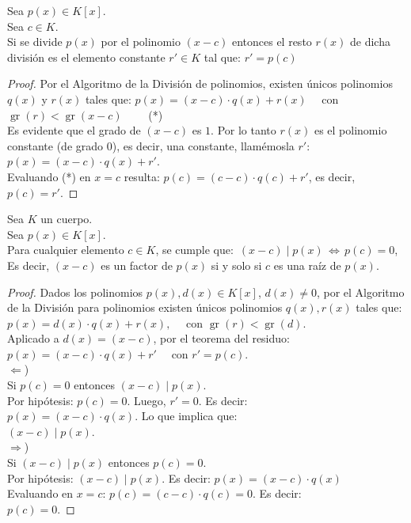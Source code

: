\begin{enunciado}\label{enun:teoResid}
Sea $p(x)  \in K[x]$. \\
Sea $c \in K$. \\
Si se divide $p(x)$ por el polinomio $(x - c)$ entonces el resto $r(x)$ de dicha división es el elemento constante $r' \in K$ tal que: $r' = p(c)$
\end{enunciado}

\begin{proof}
Por el Algoritmo de la División de polinomios, existen únicos polinomios $q(x)$ y $r(x)$ tales que: $p(x) = (x - c) \cdot q(x) + r(x) \quad$ con 
$\operatorname{gr}(r) < \operatorname{gr}(x - c) \qquad$  \hfill (*) \\
Es evidente que el grado de $(x - c)$ es $1$. Por lo tanto $r(x)$ es el polinomio constante (de grado 0), es decir, una constante, llamémosla $r'$: $p(x) = (x - c) \cdot q(x) + r'$. \\
Evaluando (*) en $x = c$ resulta: $p(c) = (c - c) \cdot q(c) + r'$, es decir, $p(c) = r'$.
\end{proof}

\begin{enunciado}\label{enun:teoFactor}
Sea $K$ un cuerpo. \\
Sea $p(x) \in K[x]$. \\
Para cualquier elemento $c \in K$, se cumple que: $\,(x - c) \mid p(x) \, \iff \, p(c) = 0$, \\
Es decir, $(x - c)$ es un factor de $p(x)$ si y solo si $c$ es una raíz de $p(x)$.
\end{enunciado}

\begin{proof}
Dados los polinomios $p(x), d(x) \in K[x]$, $d(x) \neq 0$, por el Algoritmo de la División para polinomios existen únicos polinomios $q(x), r(x)$ tales que: \\
$p(x) = d(x) \cdot q(x) + r(x), \quad$ con $\operatorname{gr}(r) < \operatorname{gr}(d)$. \\
Aplicado a $d(x) = (x - c)$, por el teorema del residuo: \\
$p(x) = (x - c) \cdot q(x) + r' \quad$ con $r'= p(c)$. \\
$\Leftarrow$) \\
Si $p(c) = 0$ entonces $(x - c) \mid p(x)$. \\
Por hipótesis: $p(c) = 0$. Luego, $r'= 0$. Es decir: \\
$p(x) = (x - c) \cdot q(x)$. Lo que implica que: \\
$(x - c) \mid p(x)$. \\
$\Rightarrow$) \\
Si $(x - c) \mid p(x)$ entonces $p(c) = 0$. \\
Por hipótesis: $(x - c) \mid p(x)$. Es decir: $p(x) = (x - c) \cdot q(x)$ \\
Evaluando en $x = c$: $p(c) = (c - c) \cdot q(c) = 0$. Es decir:\\
$p(c) = 0$.
\end{proof}

